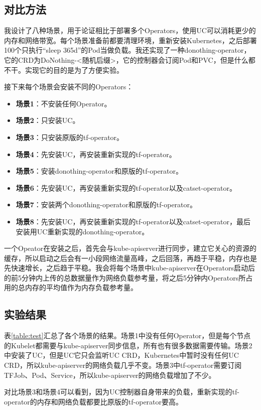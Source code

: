 \documentclass[macfonts,master]{njuthesis}
\begin{document}
\subsection{对比方法}

我设计了八种场景，用于论证相比于部署多个Operators，使用UC可以消耗更少的内存和网络带宽。每个场景准备前都要清理环境，重新安装Kubernetes，之后部署100个只执行``sleep 365d''的Pod当做负载。我还实现了一种donothing-operator，它的CRD为DoNothing-<随机后缀>，它的控制器会订阅Pod和PVC，但是什么都不干。实现它的目的是为了方便实验。

接下来每个场景会安装不同的Operators：
\begin{itemize}
	\item \textbf{场景1}：不安装任何Operator。
	\item \textbf{场景2}：只安装UC。
	\item \textbf{场景3}：只安装原版的tf-operator。
	\item \textbf{场景4}：先安装UC，再安装重新实现的tf-operator。
	\item \textbf{场景5}：安装donothing-operator和原版的tf-operator。
	\item \textbf{场景6}：先安装UC，再安装重新实现的tf-operator以及catset-operator。
	\item \textbf{场景7}：安装两个donothing-operator和原版的tf-operator。
	\item \textbf{场景8}：先安装UC，再安装重新实现的tf-operator以及catset-operator，最后安装用UC重新实现的donothing-operator。
\end{itemize}

一个Opeator在安装之后，首先会与kube-apiserver进行同步，建立它关心的资源的缓存，所以启动之后会有一小段网络流量高峰，之后回落，再趋于平稳，内存也是先快速增长，之后趋于平稳。我会将每个场景中kube-apiserver在Operators启动后的前5分钟内上传的总数据量作为网络负载参考量，将之后5分钟内Operators所占用的总内存的平均值作为内存负载参考量。

\subsection{实验结果}
表\ref{table:test}汇总了各个场景的结果。场景1中没有任何Operator，但是每个节点的Kubelet都需要与kube-apiserver同步信息，所有也有很多数据需要传输。场景2中安装了UC，但是UC它只会监听UC CRD，Kubernetes中暂时没有任何UC CRD，所以kube-apiserver的网络负载几乎不变。场景3中tf-operator需要订阅TFJob、Pod、Service，所以kube-apiserver的网络负载增加了不少。

对比场景3和场景4可以看到，因为UC控制器自身带来的负载，重新实现的tf-operator的内存和网络负载都要比原版的tf-operator要高。
\end{document}
